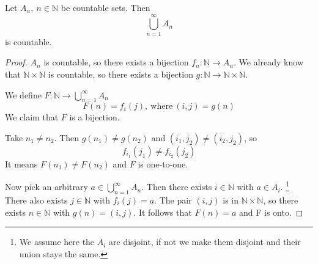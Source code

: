 \begin{thm}
Let $A_n, ~n \in \mathbb{N}$ be countable sets. Then 
$$
\bigcup_{n=1}^\infty A_n
$$ 
is countable.
\end{thm}

\begin{proof}
$A_n$ is countable, so there exists a bijection $f_n:\mathbb{N} \rightarrow A_n$. We already know that $\mathbb{N} \times \mathbb{N}$ is countable, so there exists a bijection $g:\mathbb{N} \rightarrow \mathbb{N} \times \mathbb{N}$.

We define $F:\mathbb{N} \rightarrow \bigcup_{n=1}^\infty A_n$
$$
F(n) = f_i(j), ~\text{where}~ (i, j) = g(n)
$$
We claim that $F$ is a bijection.

Take $n_1 \ne n_2$. Then $g(n_1) \ne g(n_2)$ and $(i_1, j_2) \ne (i_2, j_2)$, so 
$$
f_{i_1}(j_1) \ne f_{i_2}(j_2)
$$
It means $F(n_1) \ne F(n_2)$ and $F$ is one-to-one.

Now pick an arbitrary $a \in \bigcup_{n=1}^\infty A_n$. Then there exists $i \in \mathbb{N}$ with $a \in A_i$. \footnote{We assume here the $A_i$ are disjoint, if not we make them disjoint and their union stays the same.} There also exists $j \in \mathbb{N}$ with $f_i(j) = a$. The pair $(i, j)$ is in
$\mathbb{N} \times \mathbb{N}$, so there exists $n \in \mathbb{N}$ with $g(n)=(i, j)$. It follows that $F(n)=a$ and F is onto. 
\end{proof}






